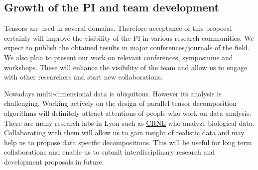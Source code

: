 \documentclass[a4paper,11pt]{article}
\begin{document}
%	
%	
	
	\subsection{Growth of the PI and team development}
	\label{sec:org:growth}
	Tensors are used in several domains. Therefore acceptance of this proposal certainly will improve the visibility of the PI in various research communities. We expect to publish the obtained results in major conferences/journals of the field. We also plan to present our work on relevant conferences, symposiums and workshops. These will enhance the visibility of the team and allow us to engage with other researchers and start new collaborations.
	
	
	
	Nowadays multi-dimensional data is ubiquitous. However its analysis is challenging. Working actively on the design of parallel tensor decomposition algorithms will definitely attract attentions of people who work on data analysis. There are many research labs in Lyon such as \href{https://www.crnl.fr/}{CRNL} who analyze biological data. Collaborating with them will allow us to gain insight of realistic data and may help us to propose data specific decompositions. This will be useful for long term collaborations and enable us to submit interdisciplinary research and development proposals in future.
	
\end{document}

